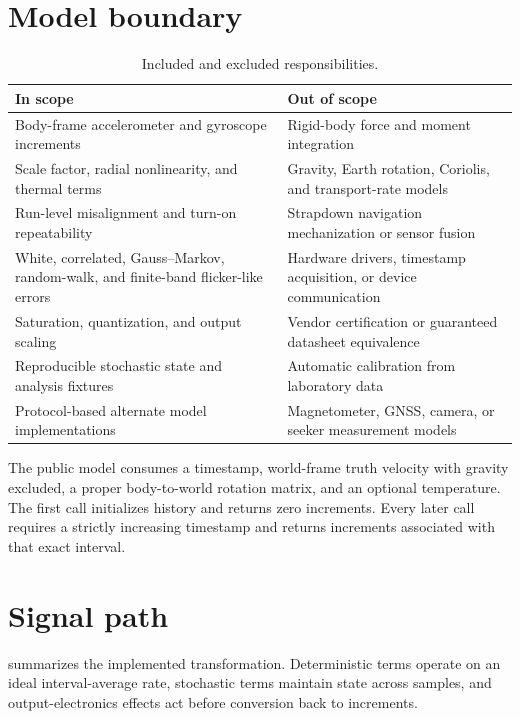 \documentclass[11pt,oneside,headings=big]{scrreprt}
\begin{document}
    \section{Model boundary}
    \begin{table}[htbp]
        \centering
        \caption{Included and excluded responsibilities.}
        \label{tab:scope}
        \begin{tabularx}{\textwidth}{@{}Y Y@{}}
\toprule
\textbf{In scope} & \textbf{Out of scope} \\
\midrule
Body-frame accelerometer and gyroscope increments & Rigid-body force and moment integration \\
Scale factor, radial nonlinearity, and thermal terms & Gravity, Earth rotation, Coriolis, and transport-rate models \\
Run-level misalignment and turn-on repeatability & Strapdown navigation mechanization or sensor fusion \\
White, correlated, Gauss--Markov, random-walk, and finite-band flicker-like errors & Hardware drivers, timestamp acquisition, or device communication \\
Saturation, quantization, and output scaling & Vendor certification or guaranteed datasheet equivalence \\
Reproducible stochastic state and analysis fixtures & Automatic calibration from laboratory data \\
Protocol-based alternate model implementations & Magnetometer, GNSS, camera, or seeker measurement models \\
\bottomrule
        \end{tabularx}
    \end{table}

    \begin{implementationbox}
        The public model consumes a timestamp, world-frame truth velocity with gravity
        excluded, a proper body-to-world rotation matrix, and an optional temperature.
        The first call initializes history and returns zero increments. Every later call
        requires a strictly increasing timestamp and returns increments associated with
        that exact interval.
    \end{implementationbox}


    \section{Signal path}
     summarizes the implemented transformation. Deterministic
    terms operate on an ideal interval-average rate, stochastic terms maintain
    state across samples, and output-electronics effects act before conversion back
    to increments.
\end{document}
